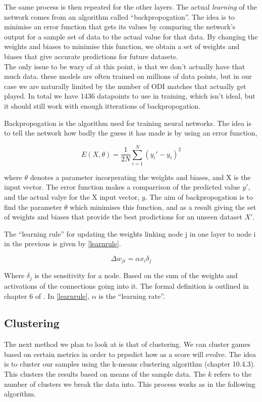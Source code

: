 \documentclass[11pt]{amsart}
\begin{document}
The same process is then repeated for the other layers. The actual \textit{learning} of the network comes from an algorithm called ``backpropogation''.
The idea is to minimise an error function that gets its values by comparing the network's output for a sample set of data to the actual value for that data. By changing 
the weights and biases to minimise this function, we obtain a set of weights and biases that give accurate predictions for future datasets. \\

The only issue to be wary of at this point, is that we don't actually have that much data. these models are often trained on millions of data points, but in our case we are naturally 
limited by the number of ODI matches that actually get played. In total we have 1436 datapoints to use in training, which isn't ideal, but it should still work with enough itterations of backpropogation.

Backpropogation is the algorithm used for training neural networks. The idea is to tell the network how badly the guess it has made is by using an error function,

\begin{equation}
    E(X,\theta) = \frac{1}{2N}\sum^N_{i=1}(y_i'-y_i)^2
\end{equation}

where $\theta$ denotes a parameter incorperating the weights and biases, and X is the input vector. The error function makes a comparrison of the predicted value $y'$, and the actual
valye for the X input vector, $y$. The aim of backpropogation is to find the parameter $\theta$ which minimises this function, and as a result
giving the set of weights and biases that provide the best prodictions for an unseen dataset $X'$. 

The ``learning rule'' for updating the weights linking node j in one layer to node i in the previous is given by \ref{learnrule}.

\begin{equation}
    \label{learnrule}
    \Delta w_{ji} = \alpha x_i \delta_j
\end{equation}

Where $\delta_j$ is the sensitivity for a node. Based on the sum of the weights and activations of the connections going into it. The formal definition is
outlined in chapter 6 of \cite{Duda}. In \ref{learnrule}, $\alpha$ is the ``learning rate''. 

\subsection{Clustering}
The next method we plan to look at is that of clustering. We can cluster games based on certain metrics in order to prpedict how as a score will evolve.
The idea is to cluster our samples using the k-means clustering algorithm \cite{Duda} (chapter 10.4.3). This clusters the results 
based on means of the sample data. The $k$ refers to the number of clusters we break the data into. This process works as in the following algorithm. \\
\end{document}
